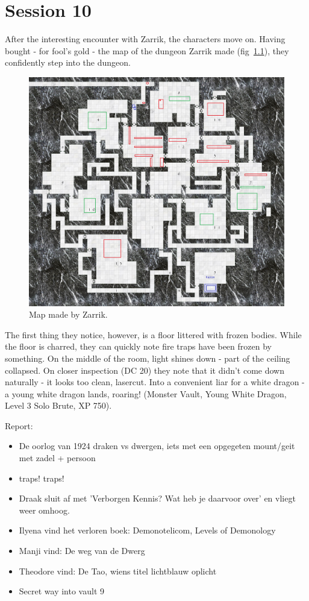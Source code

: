 \chapter{Session 10}
After the interesting encounter with Zarrik, the characters move on. Having bought - for fool's gold - the map of the dungeon Zarrik made (fig~\ref{fig:firsttemple}), they confidently step into the dungeon.
\begin{figure}[h]
    \centering
    \includegraphics[height=.5\textheight]{fig/firsttemple.jpg}
    \caption{\label{fig:firsttemple} Map made by Zarrik.}
\end{figure}

The first thing they notice, however, is a floor littered with frozen bodies. While the floor is charred, they can quickly note fire traps have been frozen by something. On the middle of the room, light shines down - part of the ceiling collapsed. On closer inspection (DC 20) they note that it didn't come down naturally - it looks too clean, lasercut. Into a convenient liar for a white dragon - a young white dragon lands, roaring! (Monster Vault, Young White Dragon, Level 3 Solo Brute, XP 750).

Report:
\begin{itemize}
\item De oorlog van 1924 draken vs dwergen, iets met een opgegeten mount/geit met zadel + persoon
\item traps! traps!
\item Draak sluit af met 'Verborgen Kennis? Wat heb je daarvoor over' en vliegt weer omhoog.
\item Ilyena vind het verloren boek: Demonotelicom, Levels of Demonology
\item Manji vind: De weg van de Dwerg
\item Theodore vind: De Tao, wiens titel lichtblauw oplicht
\item Secret way into vault 9
\end{itemize}


